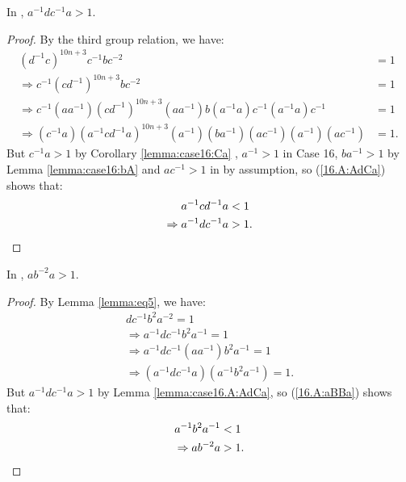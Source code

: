 \begin{lemma} In , $a^{-1}dc^{-1}a>1$.
\label{lemma:case16.A:AdCa}
\end{lemma}
\begin{proof} By the third group relation, we have:
\begin{align}
(d^{-1}c)^{10n+3}c^{-1}bc^{-2}&=1\nonumber{}\\
\Rightarrow{}c^{-1}(cd^{-1})^{10n+3}bc^{-2}&=1\nonumber{}\\
\Rightarrow{}c^{-1}(aa^{-1})(cd^{-1})^{10n+3}(aa^{-1})b(a^{-1}a)c^{-1}(a^{-1}a)c^{-1}&=1\nonumber{}\\
\Rightarrow{}(c^{-1}a)(a^{-1}cd^{-1}a)^{10n+3}(a^{-1})(ba^{-1})(ac^{-1})(a^{-1})(ac^{-1})&=1.\label{16.A:AdCa}\
\end{align}
But $c^{-1}a>1$ by Corollary \ref{lemma:case16:Ca} , $a^{-1}>1$ in Case 16, $ba^{-1}>1$ by Lemma \ref{lemma:case16:bA} and $ac^{-1}>1$ in  by assumption, so (\ref{16.A:AdCa}) shows that:
\begin{align*}
a^{-1}cd^{-1}a&<1\\
\Rightarrow{}a^{-1}dc^{-1}a&>1.\qedhere
\end{align*}
\end{proof}

\begin{lemma} In , $ab^{-2}a>1$.
\label{lemma:case16.A:aBBa}
\end{lemma}
\begin{proof} By Lemma \ref{lemma:eq5}, we have:
\begin{align}
dc^{-1}b^{2}a^{-2}=1\nonumber{}\\
\Rightarrow{}a^{-1}dc^{-1}b^{2}a^{-1}=1\nonumber{}\\
\Rightarrow{}a^{-1}dc^{-1}(aa^{-1})b^{2}a^{-1}=1\nonumber{}\\
\Rightarrow{}(a^{-1}dc^{-1}a)(a^{-1}b^{2}a^{-1})=1.\label{16.A:aBBa}
\end{align}
But $a^{-1}dc^{-1}a>1$ by Lemma \ref{lemma:case16.A:AdCa}, so (\ref{16.A:aBBa}) shows that:
\begin{align*}
a^{-1}b^{2}a^{-1}&<1\\
\Rightarrow{}ab^{-2}a&>1.\qedhere
\end{align*}
\end{proof}

